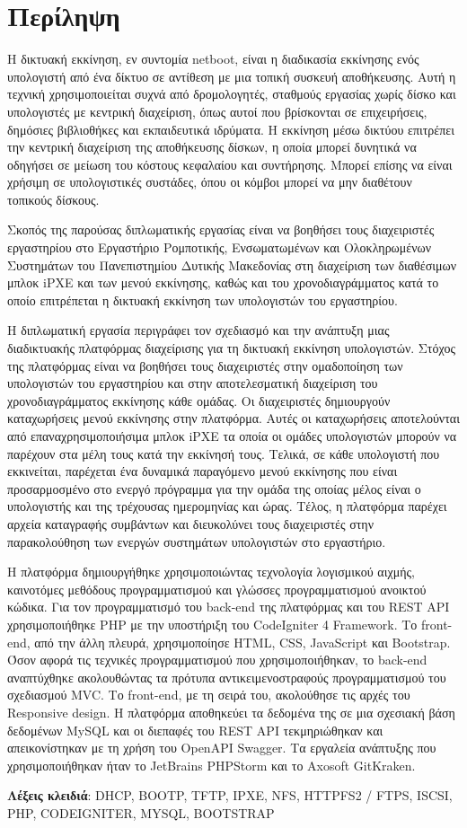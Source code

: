 \chapter*{Περίληψη}
Η δικτυακή εκκίνηση, εν συντομία netboot, είναι η διαδικασία εκκίνησης ενός υπολογιστή από ένα δίκτυο σε αντίθεση με μια τοπική συσκευή αποθήκευσης. Αυτή η τεχνική χρησιμοποιείται συχνά από δρομολογητές, σταθμούς εργασίας χωρίς δίσκο και υπολογιστές με κεντρική διαχείριση, όπως αυτοί που βρίσκονται σε επιχειρήσεις, δημόσιες βιβλιοθήκες και εκπαιδευτικά ιδρύματα. Η εκκίνηση μέσω δικτύου επιτρέπει την κεντρική διαχείριση της αποθήκευσης δίσκων, η οποία μπορεί δυνητικά να οδηγήσει σε μείωση του κόστους κεφαλαίου και συντήρησης. Μπορεί επίσης να είναι χρήσιμη σε υπολογιστικές συστάδες, όπου οι κόμβοι μπορεί να μην διαθέτουν τοπικούς δίσκους.

Σκοπός της παρούσας διπλωματικής εργασίας είναι να βοηθήσει τους διαχειριστές εργαστηρίου στο Εργαστήριο Ρομποτικής, Ενσωματωμένων και Ολοκληρωμένων Συστημάτων του Πανεπιστημίου Δυτικής Μακεδονίας στη διαχείριση των διαθέσιμων μπλοκ iPXE και των μενού εκκίνησης, καθώς και του χρονοδιαγράμματος κατά το οποίο επιτρέπεται η δικτυακή εκκίνηση των υπολογιστών του εργαστηρίου.

Η διπλωματική εργασία περιγράφει τον σχεδιασμό και την ανάπτυξη μιας διαδικτυακής πλατφόρμας διαχείρισης για τη δικτυακή εκκίνηση υπολογιστών. Στόχος της πλατφόρμας είναι να βοηθήσει τους διαχειριστές στην ομαδοποίηση των υπολογιστών του εργαστηρίου και στην αποτελεσματική διαχείριση του χρονοδιαγράμματος εκκίνησης κάθε ομάδας. Οι διαχειριστές δημιουργούν καταχωρήσεις μενού εκκίνησης στην πλατφόρμα. Αυτές οι καταχωρήσεις αποτελούνται από επαναχρησιμοποιήσιμα μπλοκ iPXE τα οποία οι ομάδες υπολογιστών μπορούν να παρέχουν στα μέλη τους κατά την εκκίνησή τους. Τελικά, σε κάθε υπολογιστή που εκκινείται, παρέχεται ένα δυναμικά παραγόμενο μενού εκκίνησης που είναι προσαρμοσμένο στο ενεργό πρόγραμμα για την ομάδα της οποίας μέλος είναι ο υπολογιστής και της τρέχουσας ημερομηνίας και ώρας. Τέλος, η πλατφόρμα παρέχει αρχεία καταγραφής συμβάντων και διευκολύνει τους διαχειριστές στην παρακολούθηση των ενεργών συστημάτων υπολογιστών στο εργαστήριο.

Η πλατφόρμα δημιουργήθηκε χρησιμοποιώντας τεχνολογία λογισμικού αιχμής, καινοτόμες μεθόδους προγραμματισμού και γλώσσες προγραμματισμού ανοικτού κώδικα. Για τον προγραμματισμό του back-end της πλατφόρμας και του REST API χρησιμοποιήθηκε PHP με την υποστήριξη του CodeIgniter 4 Framework. Το front-end, από την άλλη πλευρά, χρησιμοποίησε HTML, CSS, JavaScript και Bootstrap. Όσον αφορά τις τεχνικές προγραμματισμού που χρησιμοποιήθηκαν, το back-end αναπτύχθηκε ακολουθώντας τα πρότυπα αντικειμενοστραφούς προγραμματισμού του σχεδιασμού MVC. Το front-end, με τη σειρά του, ακολούθησε τις αρχές του Responsive design. Η πλατφόρμα αποθηκεύει τα δεδομένα της σε μια σχεσιακή βάση δεδομένων MySQL και οι διεπαφές του REST API τεκμηριώθηκαν και απεικονίστηκαν με τη χρήση του OpenAPI Swagger. Τα εργαλεία ανάπτυξης που χρησιμοποιήθηκαν ήταν το JetBrains PHPStorm και το Axosoft GitKraken.

\vfill
\textbf{Λέξεις κλειδιά}: DHCP, BOOTP, TFTP, IPXE, NFS, HTTPFS2 / FTPS, ISCSI, PHP, CODEIGNITER, MYSQL, BOOTSTRAP
